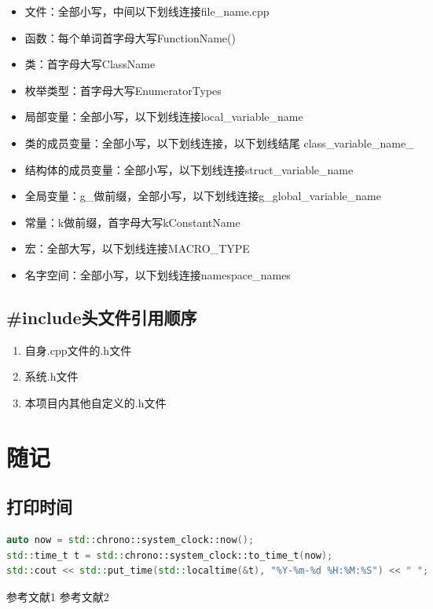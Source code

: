 \documentclass[11pt,a4paper]{article}
\begin{document}
\begin{itemize}
    \item 文件：全部小写，中间以下划线连接file\_name.cpp
    \item 函数：每个单词首字母大写FunctionName()
    \item 类：首字母大写ClassName
    \item 枚举类型：首字母大写EnumeratorTypes
    \item 局部变量：全部小写，以下划线连接local\_variable\_name
    \item 类的成员变量：全部小写，以下划线连接，以下划线结尾 class\_variable\_name\_
    \item 结构体的成员变量：全部小写，以下划线连接struct\_variable\_name
    \item 全局变量：g\_做前缀，全部小写，以下划线连接g\_global\_variable\_name
    \item 常量：k做前缀，首字母大写kConstantName
    \item 宏：全部大写，以下划线连接MACRO\_TYPE
    \item 名字空间：全部小写，以下划线连接namespace\_names
\end{itemize}

\subsection{\#include头文件引用顺序}

\begin{enumerate}
    \item 自身.cpp文件的.h文件
    \item 系统.h文件
    \item 本项目内其他自定义的.h文件
\end{enumerate}

\section{随记}

\subsection{打印时间}

\begin{lstlisting}[language={C++}]
auto now = std::chrono::system_clock::now();
std::time_t t = std::chrono::system_clock::to_time_t(now);
std::cout << std::put_time(std::localtime(&t), "%Y-%m-%d %H:%M:%S") << " ";
\end{lstlisting}

\begin{thebibliography}{99}
 参考文献1
 参考文献2
\end{thebibliography}
\end{document}
